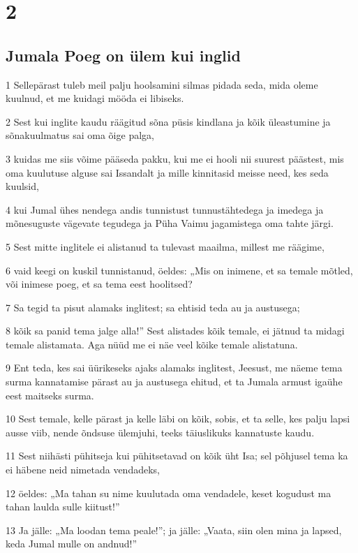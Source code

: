\chapter{2}

\section*{Jumala Poeg on ülem kui inglid}

\par 1 Sellepärast tuleb meil palju hoolsamini silmas pidada seda, mida oleme kuulnud, et me kuidagi mööda ei libiseks.
\par 2 Sest kui inglite kaudu räägitud sõna püsis kindlana ja kõik üleastumine ja sõnakuulmatus sai oma õige palga,
\par 3 kuidas me siis võime pääseda pakku, kui me ei hooli nii suurest päästest, mis oma kuulutuse alguse sai Issandalt ja mille kinnitasid meisse need, kes seda kuulsid,
\par 4 kui Jumal ühes nendega andis tunnistust tunnustähtedega ja imedega ja mõnesuguste vägevate tegudega ja Püha Vaimu jagamistega oma tahte järgi.
\par 5 Sest mitte inglitele ei alistanud ta tulevast maailma, millest me räägime,
\par 6 vaid keegi on kuskil tunnistanud, öeldes: „Mis on inimene, et sa temale mõtled, või inimese poeg, et sa tema eest hoolitsed?
\par 7 Sa tegid ta pisut alamaks inglitest; sa ehtisid teda au ja austusega;
\par 8 kõik sa panid tema jalge alla!” Sest alistades kõik temale, ei jätnud ta midagi temale alistamata. Aga nüüd me ei näe veel kõike temale alistatuna.
\par 9 Ent teda, kes sai üürikeseks ajaks alamaks inglitest, Jeesust, me näeme tema surma kannatamise pärast au ja austusega ehitud, et ta Jumala armust igaühe eest maitseks surma.
\par 10 Sest temale, kelle pärast ja kelle läbi on kõik, sobis, et ta selle, kes palju lapsi ausse viib, nende õndsuse ülemjuhi, teeks täiuslikuks kannatuste kaudu.
\par 11 Sest niihästi pühitseja kui pühitsetavad on kõik üht Isa; sel põhjusel tema ka ei häbene neid nimetada vendadeks,
\par 12 öeldes: „Ma tahan su nime kuulutada oma vendadele, keset kogudust ma tahan laulda sulle kiitust!”
\par 13 Ja jälle: „Ma loodan tema peale!”; ja jälle: „Vaata, siin olen mina ja lapsed, keda Jumal mulle on andnud!”
